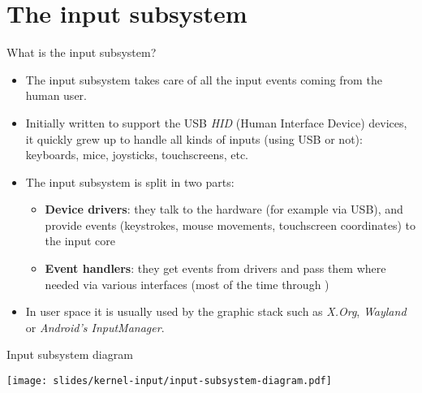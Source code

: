 \section{The input subsystem}

\begin{frame}{What is the input subsystem?}
  \begin{itemize}
  \item The input subsystem takes care of all the input events coming
    from the human user.
  \item Initially written to support the USB {\em HID} (Human
    Interface Device) devices, it quickly grew up to handle all kinds
    of inputs (using USB or not): keyboards, mice, joysticks,
    touchscreens, etc.
  \item The input subsystem is split in two parts:
    \begin{itemize}
    \item {\bf Device drivers}: they talk to the hardware (for example
      via USB), and provide events (keystrokes, mouse movements,
      touchscreen coordinates) to the input core
    \item {\bf Event handlers}: they get events from drivers and pass
      them where needed via various interfaces (most of the time
      through )
    \end{itemize}
  \item In user space it is usually used by the graphic stack such
    as {\em X.Org}, {\em Wayland} or {\em Android's InputManager}.
  \end{itemize}
\end{frame}

\begin{frame}{Input subsystem diagram}
  \begin{center}
    \texttt{[image: slides/kernel-input/input-subsystem-diagram.pdf]}
  \end{center}
\end{frame}

